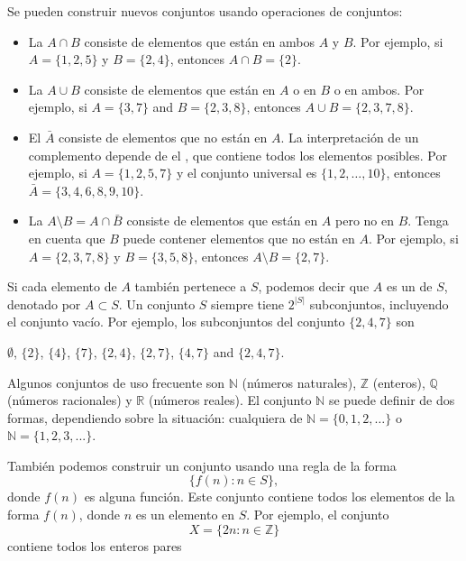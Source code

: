 \begin{samepage}
Se pueden construir nuevos conjuntos usando operaciones de conjuntos:
\begin{itemize}
\item La  $A \cap B$ consiste de elementos
que están en ambos $A$ y $B$.
Por ejemplo, si $A=\{1,2,5\}$ y $B=\{2,4\}$,
entonces $A \cap B = \{2\}$.
\item La  $A \cup B$ consiste de elementos
que están en $A$ o en $B$ o en ambos.
Por ejemplo, si $A=\{3,7\}$ and $B=\{2,3,8\}$,
entonces $A \cup B = \{2,3,7,8\}$.
\item El  $\bar A$ consiste de elementos
que no están en $A$.
La interpretación de un complemento depende de
el , que contiene todos los elementos posibles.
Por ejemplo, si $A=\{1,2,5,7\}$ y el conjunto universal es
$\{1,2,\ldots,10\}$, entonces $\bar A = \{3,4,6,8,9,10\}$.
\item La  $A \setminus B = A \cap \bar B$
consiste de elementos que están en $A$ pero no en $B$.
Tenga en cuenta que $B$ puede contener elementos que no están en $A$.
Por ejemplo, si $A=\{2,3,7,8\}$ y $B=\{3,5,8\}$,
entonces $A \setminus B = \{2,7\}$.
\end{itemize}
\end{samepage}

Si cada elemento de $A$ también pertenece a $S$,
podemos decir que $A$ es un  de $S$,
denotado por $A \subset S$.
Un conjunto $S$ siempre tiene $2^{|S|}$ subconjuntos,
incluyendo el conjunto vacío.
Por ejemplo, los subconjuntos del conjunto $\{2,4,7\}$ son
\begin{center}
$\emptyset$,
$\{2\}$, $\{4\}$, $\{7\}$, $\{2,4\}$, $\{2,7\}$, $\{4,7\}$ and $\{2,4,7\}$.
\end{center}

Algunos conjuntos de uso frecuente son
$\mathbb{N}$ (números naturales),
$\mathbb{Z}$ (enteros),
$\mathbb{Q}$ (números racionales) y
$\mathbb{R}$ (números reales).
El conjunto $\mathbb{N}$
se puede definir de dos formas, dependiendo
sobre la situación:
cualquiera de $\mathbb{N}=\{0,1,2,\ldots\}$
o $\mathbb{N}=\{1,2,3,...\}$.

También podemos construir un conjunto usando una regla de la forma
\[\{f(n) : n \in S\},\]
donde $f(n)$ es alguna función.
Este conjunto contiene todos los elementos de la forma $f(n)$,
donde $n$ es un elemento en $S$.
Por ejemplo, el conjunto
\[X=\{2n : n \in \mathbb{Z}\}\]
contiene todos los enteros pares


